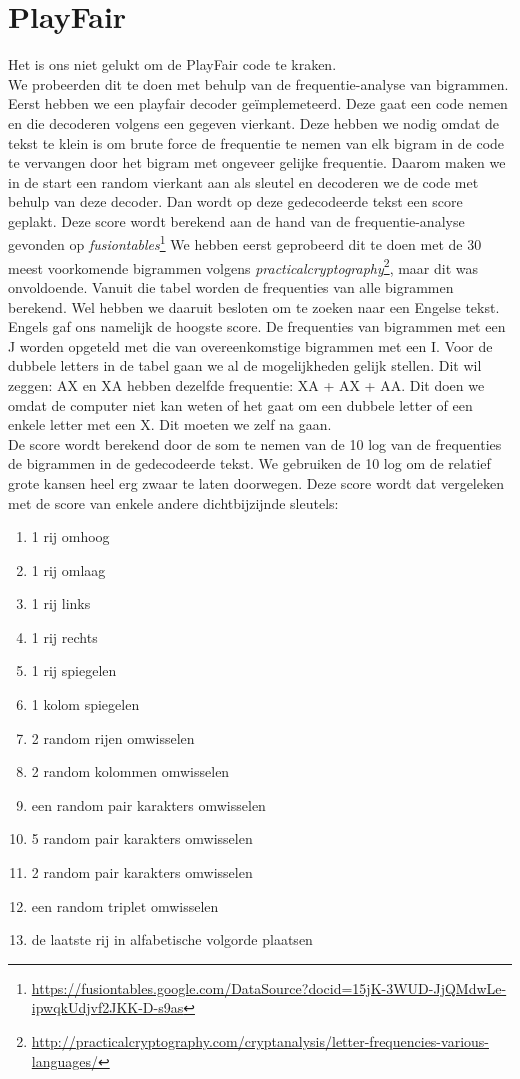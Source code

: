 \documentclass[fleqn]{article}
\begin{document}
	
	
	\section{PlayFair}
	Het is ons niet gelukt om de PlayFair code te kraken.\\
	We probeerden dit te doen met behulp van de frequentie-analyse van bigrammen. Eerst hebben we een playfair decoder ge\"{i}mplemeteerd. Deze gaat een code nemen en die decoderen volgens een gegeven vierkant. Deze hebben we nodig omdat de tekst te klein is om brute force de frequentie te nemen van elk bigram in de code te vervangen door het bigram met ongeveer gelijke frequentie. Daarom maken we in de start een random vierkant aan als sleutel en decoderen we de code met behulp van deze decoder. Dan wordt op deze gedecodeerde tekst een score geplakt. Deze score wordt berekend aan de hand van de frequentie-analyse gevonden op \textit{fusiontables}\footnote{\url{https://fusiontables.google.com/DataSource?docid=15jK-3WUD-JjQMdwLe-ipwqkUdjvf2JKK-D-s9as}} We hebben eerst geprobeerd dit te doen met de 30 meest voorkomende bigrammen volgens \textit{practicalcryptography}\footnote{\url{http://practicalcryptography.com/cryptanalysis/letter-frequencies-various-languages/}}, maar dit was onvoldoende.
	Vanuit die tabel worden de frequenties van alle bigrammen berekend. Wel hebben we daaruit besloten om te zoeken naar een Engelse tekst. Engels gaf ons namelijk de hoogste score. De frequenties van bigrammen met een J worden opgeteld met die van overeenkomstige bigrammen met een I. Voor de dubbele letters in de tabel gaan we al de mogelijkheden gelijk stellen. Dit wil zeggen: AX en XA hebben dezelfde frequentie: XA + AX + AA. Dit doen we omdat de computer niet kan weten of het gaat om een dubbele letter of een enkele letter met een X. Dit moeten we zelf na gaan.\\
	De score wordt berekend door de som te nemen van de 10 log van de frequenties de bigrammen in de gedecodeerde tekst. We gebruiken de 10 log om de relatief grote kansen heel erg zwaar te laten doorwegen.
	Deze score wordt dat vergeleken met de score van enkele andere dichtbijzijnde sleutels:
	\begin{enumerate}
		\item 1 rij omhoog
		\item 1 rij omlaag
		\item 1 rij links
		\item 1 rij rechts
		\item 1 rij spiegelen
		\item 1 kolom spiegelen
		\item 2 random rijen omwisselen
		\item 2 random kolommen omwisselen
		\item een random pair karakters omwisselen
		\item 5 random pair karakters omwisselen
		\item 2 random pair karakters omwisselen
		\item een random triplet omwisselen
		\item de laatste rij in alfabetische volgorde plaatsen
	\end{enumerate}
\end{document}
